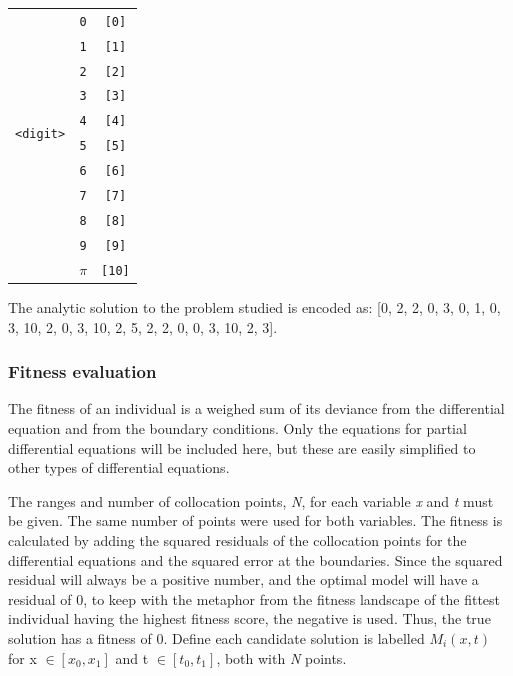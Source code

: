 \documentclass[multicolumn, 12pt]{extarticle}
\begin{document}
\begin{table}[h]
\begin{tabular}{ccc}
		\midrule

		\multirow{10}{*}{\texttt{<digit>}}
		     & \multicolumn{1}{c}{\texttt{0}}                  & \multicolumn{1}{c}{\texttt{[0]}}  \\
		     & \multicolumn{1}{c}{\texttt{1}}                  & \multicolumn{1}{c}{\texttt{[1]}}  \\
		     & \multicolumn{1}{c}{\texttt{2}}                  & \multicolumn{1}{c}{\texttt{[2]}}  \\
		     & \multicolumn{1}{c}{\texttt{3}}                  & \multicolumn{1}{c}{\texttt{[3]}}  \\
		     & \multicolumn{1}{c}{\texttt{4}}                  & \multicolumn{1}{c}{\texttt{[4]}}  \\
		     & \multicolumn{1}{c}{\texttt{5}}                  & \multicolumn{1}{c}{\texttt{[5]}}  \\
		     & \multicolumn{1}{c}{\texttt{6}}                  & \multicolumn{1}{c}{\texttt{[6]}}  \\
		     & \multicolumn{1}{c}{\texttt{7}}                  & \multicolumn{1}{c}{\texttt{[7]}}  \\
		     & \multicolumn{1}{c}{\texttt{8}}                  & \multicolumn{1}{c}{\texttt{[8]}}  \\
		     & \multicolumn{1}{c}{\texttt{9}}                  & \multicolumn{1}{c}{\texttt{[9]}}  \\
		     & \multicolumn{1}{c}{\texttt{$\pi$}}              & \multicolumn{1}{c}{\texttt{[10]}} \\

		\bottomrule
	\end{tabular}
\end{table}


The analytic solution to the problem studied is encoded as: [0, 2, 2, 0, 3, 0, 1, 0, 3, 10, 2, 0, 3, 10, 2, 5, 2, 2, 0, 0, 3, 10, 2, 3].

\subsubsection{Fitness evaluation}
The fitness of an individual is a weighed sum of its deviance from the differential equation and from the boundary conditions. Only the equations for partial differential equations will be included here, but these are easily simplified to other types of differential equations.

The ranges and number of collocation points, \textit{N}, for each variable \textit{x} and \textit{t} must be given. The same number of points were used for both variables. The fitness is calculated by adding the squared residuals of the collocation points for the differential equations and the squared error at the boundaries. Since the squared residual will always be a positive number, and the optimal model will have a residual of 0, to keep with the metaphor from the fitness landscape of the fittest individual having the highest fitness score, the negative is used. Thus, the true solution has a fitness of 0. Define each candidate solution is labelled $M_{i}(x, t)$ for x $\in [x_{0}, x_{1}]$ and t $\in [t_{0}, t_{1}]$, both with \textit{N} points.
\end{document}
